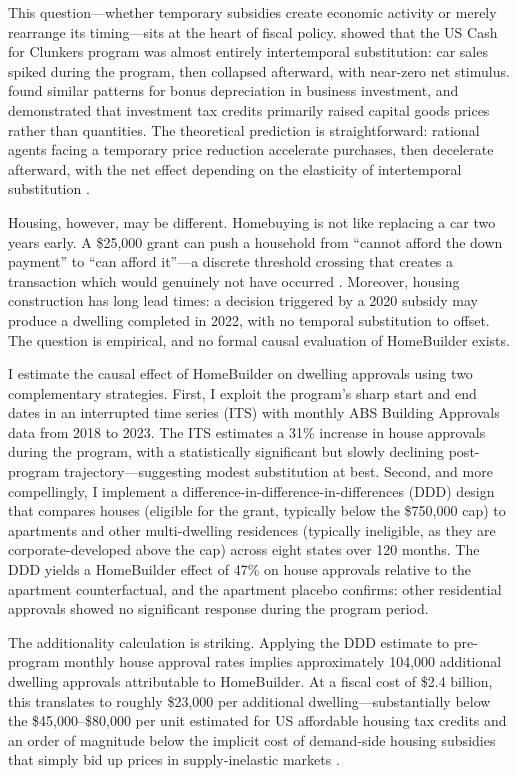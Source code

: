 \documentclass[12pt]{article}
\begin{document}
This question---whether temporary subsidies create economic activity or merely rearrange its timing---sits at the heart of fiscal policy. \citet{mian2012} showed that the US Cash for Clunkers program was almost entirely intertemporal substitution: car sales spiked during the program, then collapsed afterward, with near-zero net stimulus. \citet{house2008} found similar patterns for bonus depreciation in business investment, and \citet{goolsbee1998} demonstrated that investment tax credits primarily raised capital goods prices rather than quantities. The theoretical prediction is straightforward: rational agents facing a temporary price reduction accelerate purchases, then decelerate afterward, with the net effect depending on the elasticity of intertemporal substitution \citep{best2020}.

Housing, however, may be different. Homebuying is not like replacing a car two years early. A \$25,000 grant can push a household from ``cannot afford the down payment'' to ``can afford it''---a discrete threshold crossing that creates a transaction which would genuinely not have occurred \citep{suarez2020}. Moreover, housing construction has long lead times: a decision triggered by a 2020 subsidy may produce a dwelling completed in 2022, with no temporal substitution to offset. The question is empirical, and no formal causal evaluation of HomeBuilder exists.

I estimate the causal effect of HomeBuilder on dwelling approvals using two complementary strategies. First, I exploit the program's sharp start and end dates in an interrupted time series (ITS) with monthly ABS Building Approvals data from 2018 to 2023. The ITS estimates a 31\% increase in house approvals during the program, with a statistically significant but slowly declining post-program trajectory---suggesting modest substitution at best. Second, and more compellingly, I implement a difference-in-difference-in-differences (DDD) design that compares houses (eligible for the grant, typically below the \$750,000 cap) to apartments and other multi-dwelling residences (typically ineligible, as they are corporate-developed above the cap) across eight states over 120 months. The DDD yields a HomeBuilder effect of 47\% on house approvals relative to the apartment counterfactual, and the apartment placebo confirms: other residential approvals showed no significant response during the program period.

The additionality calculation is striking. Applying the DDD estimate to pre-program monthly house approval rates implies approximately 104,000 additional dwelling approvals attributable to HomeBuilder. At a fiscal cost of \$2.4 billion, this translates to roughly \$23,000 per additional dwelling---substantially below the \$45,000--\$80,000 per unit estimated for US affordable housing tax credits \citep{suarez2020} and an order of magnitude below the implicit cost of demand-side housing subsidies that simply bid up prices in supply-inelastic markets \citep{glaeser2008}.
\end{document}
